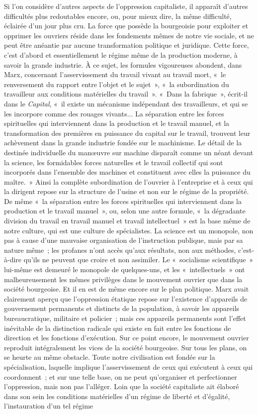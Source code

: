 \documentclass[french,twoside]{book} %
\begin{document}
Si l'on considère d'autres aspects de l'oppression capitaliste, il apparaît d'autres difficultés plus redoutables encore, ou, pour mieux dire, la même difficulté, éclairée d'un jour plus cru. La force que possède la bourgeoisie pour exploiter et opprimer les ouvriers réside dans les fondements mêmes de notre vie sociale, et ne peut être anéantie par aucune transformation politique et juridique. Cette force, c'est d'abord et essentiellement le régime même de la production moderne, à savoir la grande industrie. À ce sujet, les formules vigoureuses abondent, dans Marx, concernant l'asservissement du travail vivant au travail mort, « le renversement du rapport entre l'objet et le sujet », « la subordination du travailleur aux conditions matérielles du travail ». « Dans la fabrique », écrit-il dans le {\itshape Capital}, « il existe un mécanisme indépendant des travailleurs, et qui se les incorpore comme des rouages vivants... La séparation entre les forces spirituelles qui interviennent dans la production et le travail manuel, et la transformation des premières en puissance du capital sur le travail, trouvent leur achèvement dans la grande industrie fondée sur le machinisme. Le détail de la destinée individuelle du manœuvre sur machine disparaît comme un néant devant la science, les formidables forces naturelles et le travail collectif qui sont incorporés dans l'ensemble des machines et constituent avec elles la puissance du maître. » Ainsi la complète subordination de l'ouvrier à l'entreprise et à ceux qui la dirigent repose sur la structure de l'usine et non sur le régime de la propriété. De même « la séparation entre les forces spirituelles qui interviennent dans la production et le travail manuel », ou, selon une autre formule, « la dégradante division du travail en travail manuel et travail intellectuel » est la base même de notre culture, qui est une culture de spécialistes. La science est un monopole, non pas à cause d'une mauvaise organisation de l'instruction publique, mais par sa nature même ; les profanes n'ont accès qu'aux résultats, non aux méthodes, c'est-à-dire qu'ils ne peuvent que croire et non assimiler. Le « socialisme scientifique » lui-même est demeuré le monopole de quelques-uns, et les « intellectuels » ont malheureusement les mêmes privilèges dans le mouvement ouvrier que dans la société bourgeoise. Et il en est de même encore sur le plan politique. Marx avait clairement aperçu que l'oppression étatique repose sur l'existence d'appareils de gouvernement permanents et distincts de la population, à savoir les appareils bureaucratique, militaire et policier ; mais ces appareils permanents sont l'effet inévitable de la distinction radicale qui existe en fait entre les fonctions de direction et les fonctions d'exécution. Sur ce point encore, le mouvement ouvrier reproduit intégralement les vices de la société bourgeoise. Sur tous les plans, on se heurte au même obstacle. Toute notre civilisation est fondée sur la spécialisation, laquelle implique l'asservissement de ceux qui exécutent à ceux qui coordonnent ; et sur une telle base, on ne peut qu'organiser et perfectionner l'oppression, mais non pas l'alléger. Loin que la société capitaliste ait élaboré dans son sein les conditions matérielles d'un régime de liberté et d'égalité, l'instauration d'un tel régime 
\end{document}
